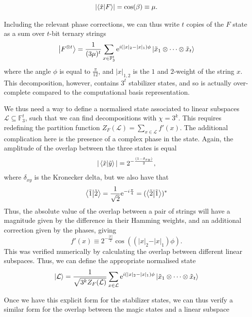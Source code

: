 \documentclass{standalone}
\begin{document}
\begin{equation}
\left|\braket{\tilde{x}}{F}\right| = \cos(\beta)\equiv\mu.
\end{equation}
\par
Including the relevant phase corrections, we can thus write $t$ copies of the $F$ state as a sum over $t$-bit ternary strings
\begin{equation}
    \ket{F^{\otimes t}} = \frac{1}{(3\mu)^{t}}\sum_{x\in\mathbb{F}_{3}^{t}}\mathrm{e}^{i(\vert x\vert_{2}-\vert x\vert_{1})\phi}\ket{\tilde{x}_{1}\otimes\cdots\otimes\tilde{x}_{t}}
\end{equation}
where the angle $\phi$ is equal to $\frac{\pi}{12}$, and $\vert x\vert_{1,2}$ is the $1$ and $2$-weight of the string $x$. This decomposition, however, contains $3^{t}$ stabilizer states, and so is actually over-complete compared to the computational basis representation. 
\par
We thus need a way to define a normalised state associated to linear subspaces $\mathcal{L}\subseteq\mathbb{F}_{3}^{t}$, such that we can find decompositions with $\chi=3^{k}$. This requires redefining the partition function $Z_{F}(\mathcal{L})=\sum_{x\in\mathcal{L}}f'(x)$. The additional complication here is the presence of a complex phase in the state. Again, the amplitude of the overlap between the three states is equal
\[\vert\braket{\tilde{x}}{\tilde{y}}\vert = 2^{-\frac{(1-\delta_{xy})}{2}},\]
where $\delta_{xy}$ is the Kronecker delta, but we also have that 
\[
\braket{\tilde{1}}{\tilde{2}}=\frac{1}{\sqrt{2}} 
\mathrm{e}^{-i\frac{\pi}{4}} 
= (\braket{\tilde{2}}{\tilde{1}})^*
\]
Thus, the absolute value of the overlap between a pair of strings will have a magnitude given by the difference in their Hamming weights, and an additional correction given by the phases, giving
\begin{equation}
    f'(x)\equiv 2^{-\frac{\vert x\vert}{2}}\cos((\vert x\vert_{2}-\vert x\vert_{1})\phi).
\end{equation}
This was verified numerically by calculating the overlap between different linear subspaces. Thus, we can define the appropriate normalised state
\begin{equation}
    \ket{\mathcal{L}}=\frac{1}{\sqrt{3^{k}Z_{F}(\mathcal{L})}}\sum_{x\in\mathcal{L}}
    \mathrm{e}^{i(\vert x\vert_{2}-\vert x\vert_{1})\phi}\ket{\tilde{x}_{1}\otimes\cdots\otimes\tilde{x}_{t}}
\end{equation}
\par
Once we have this explicit form for the stabilizer states, we can thus verify a similar form for the overlap between the magic states and a linear subspace
\end{document}

